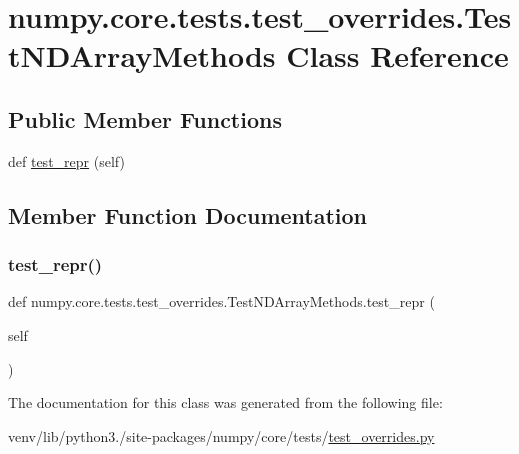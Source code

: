 \hypertarget{classnumpy_1_1core_1_1tests_1_1test__overrides_1_1TestNDArrayMethods}{}\section{numpy.\+core.\+tests.\+test\+\_\+overrides.\+Test\+N\+D\+Array\+Methods Class Reference}
\label{classnumpy_1_1core_1_1tests_1_1test__overrides_1_1TestNDArrayMethods}
\subsection*{Public Member Functions}
\begin{DoxyCompactItemize}
\item 
def \hyperlink{classnumpy_1_1core_1_1tests_1_1test__overrides_1_1TestNDArrayMethods_a14945ec1833e9b5550496dd929711109}{test\+\_\+repr} (self)
\end{DoxyCompactItemize}


\subsection{Member Function Documentation}
\mbox{\label{classnumpy_1_1core_1_1tests_1_1test__overrides_1_1TestNDArrayMethods_a14945ec1833e9b5550496dd929711109}} 
\subsubsection{\texorpdfstring{test\+\_\+repr()}{test\_repr()}}
{\footnotesize\ttfamily def numpy.\+core.\+tests.\+test\+\_\+overrides.\+Test\+N\+D\+Array\+Methods.\+test\+\_\+repr (\begin{DoxyParamCaption}\item[{}]{self }\end{DoxyParamCaption})}



The documentation for this class was generated from the following file\+:\begin{DoxyCompactItemize}
\item 
venv/lib/python3./site-\/packages/numpy/core/tests/\hyperlink{test__overrides_8py}{test\+\_\+overrides.\+py}\end{DoxyCompactItemize}
